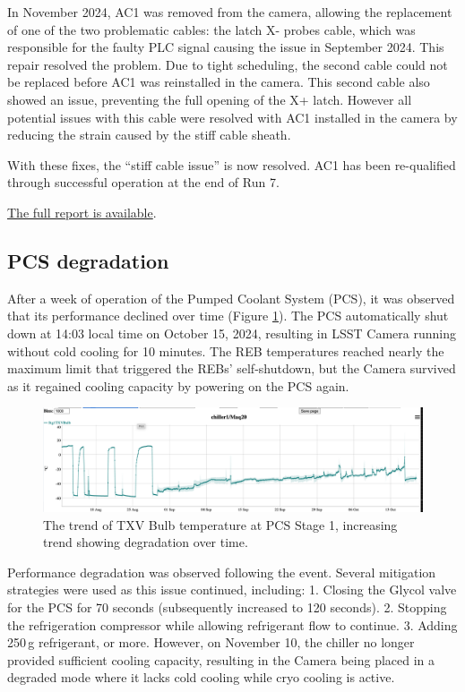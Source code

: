 In November 2024, AC1 was removed from the camera, allowing the replacement of one of the two problematic cables: the latch X- probes cable, which was responsible for the faulty PLC signal causing the issue in September 2024. This repair resolved the problem. Due to tight scheduling, the second cable could not be replaced before AC1 was reinstalled in the camera. This second cable also showed an issue, preventing the full opening of the X+ latch. However all potential  issues with this cable were resolved with AC1 installed in the camera by reducing the strain caused by the stiff cable sheath.

With these fixes, the “stiff cable issue” is now resolved. AC1 has been re-qualified through successful operation at the end of Run 7.

\href{https://rubinobs.atlassian.net/browse/FRACAS-241}{The full report is available}.

\clearpage
\subsection{PCS degradation}\label{sec:pcsdegradation}
After a week of operation of the Pumped Coolant System (PCS), it was observed that its performance declined over time (Figure \ref{fig:pcsdegradation}). The PCS automatically shut down at 14:03 local time on October 15, 2024, resulting in LSST Camera running without cold cooling for 10 minutes. The REB temperatures reached nearly the maximum limit that triggered the REBs' self-shutdown, but the Camera survived as it regained cooling capacity by powering on the PCS again.
\begin{figure}[ht]
    \centering
    \includegraphics[width=1\linewidth]{figures//Issues/PCSTXVBulbAug11toOct17.png}
    \caption{The trend of TXV Bulb temperature at PCS Stage 1, increasing trend showing degradation over time.}
    \label{fig:pcsdegradation}
\end{figure}

Performance degradation was observed following the event. Several mitigation strategies were used as this issue continued, including:
1. Closing the Glycol valve for the PCS for 70 seconds (subsequently increased to 120 seconds).
2. Stopping the refrigeration compressor while allowing refrigerant flow to continue.
3. Adding 250\,g refrigerant, or more.
However, on November 10, the chiller no longer provided sufficient cooling capacity, resulting in the Camera being placed in a degraded mode where it lacks cold cooling while cryo cooling is active.

